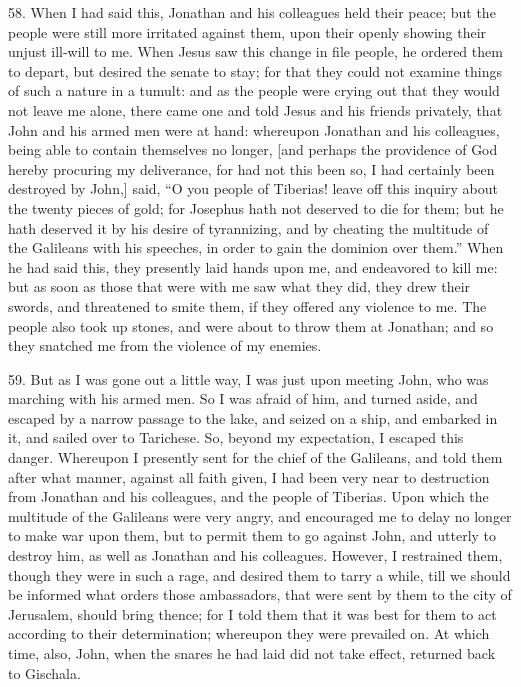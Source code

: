 58. When I had said this, Jonathan and his colleagues held their peace;
but the people were still more irritated against them, upon their openly
showing their unjust ill-will to me. When Jesus saw this change in file
people, he ordered them to depart, but desired the senate to stay; for
that they could not examine things of such a nature in a tumult: and as
the people were crying out that they would not leave me alone, there came
one and told Jesus and his friends privately, that John and his armed men
were at hand: whereupon Jonathan and his colleagues, being able to contain
themselves no longer, [and perhaps the providence of God hereby procuring
my deliverance, for had not this been so, I had certainly been destroyed
by John,] said, ``O you people of Tiberias! leave off this inquiry about
the twenty pieces of gold; for Josephus hath not deserved to die for them;
but he hath deserved it by his desire of tyrannizing, and by cheating the
multitude of the Galileans with his speeches, in order to gain the
dominion over them.'' When he had said this, they presently laid hands upon
me, and endeavored to kill me: but as soon as those that were with me saw
what they did, they drew their swords, and threatened to smite them, if
they offered any violence to me. The people also took up stones, and were
about to throw them at Jonathan; and so they snatched me from the violence
of my enemies.

59. But as I was gone out a little way, I was just upon meeting John, who
was marching with his armed men. So I was afraid of him, and turned aside,
and escaped by a narrow passage to the lake, and seized on a ship, and
embarked in it, and sailed over to Tarichese. So, beyond my expectation, I
escaped this danger. Whereupon I presently sent for the chief of the
Galileans, and told them after what manner, against all faith given, I had
been very near to destruction from Jonathan and his colleagues, and the
people of Tiberias. Upon which the multitude of the Galileans were very
angry, and encouraged me to delay no longer to make war upon them, but to
permit them to go against John, and utterly to destroy him, as well as
Jonathan and his colleagues. However, I restrained them, though they were
in such a rage, and desired them to tarry a while, till we should be
informed what orders those ambassadors, that were sent by them to the city
of Jerusalem, should bring thence; for I told them that it was best for
them to act according to their determination; whereupon they were
prevailed on. At which time, also, John, when the snares he had laid did
not take effect, returned back to Gischala.

